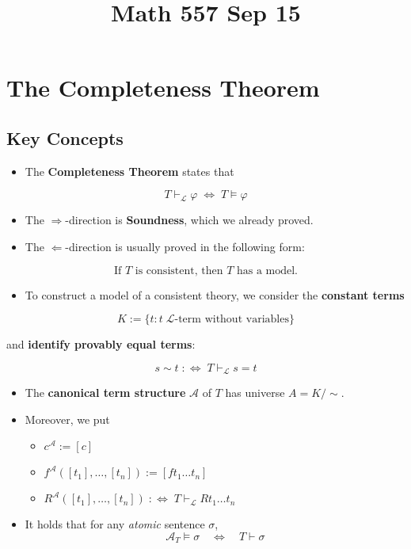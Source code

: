 \documentclass[
]{article}
\title{Math 557 Sep 15}
\author{}
\date{}
\providecommand{\tightlist}{%
  \setlength{\itemsep}{0pt}\setlength{\parskip}{0pt}}
\theoremstyle{definition}
\theoremstyle{remark}
\begin{document}
\maketitle


\section{The Completeness Theorem}\label{the-completeness-theorem}

\subsection{Key Concepts}\label{key-concepts}

\begin{itemize}
\tightlist
\item
  The \textbf{Completeness Theorem} states that
\end{itemize}

\[T \vdash_{\mathcal{L}} \varphi  \; \iff \; T \models \varphi\]

\begin{itemize}
\item
  The \(\Rightarrow\)-direction is \textbf{Soundness}, which we already
  proved.
\item
  The \(\Leftarrow\)-direction is usually proved in the following form:
\end{itemize}

\[\text{If $T$ is consistent, then $T$ has a model.}\]

\begin{itemize}
\tightlist
\item
  To construct a model of a consistent theory, we consider the
  \textbf{constant terms}
\end{itemize}

\[K := \{ t \colon t \; \mathcal{L}\text{-term without variables}\}\]

and \textbf{identify provably equal terms}:

\[s \sim t \; :\iff \; T \vdash_{\mathcal{L}} s = t\]

\begin{itemize}
\item
  The \textbf{canonical term structure} \(\mathcal{A}\) of \(T\) has
  universe \(A = K/\sim\).
\item
  Moreover, we put

  \begin{itemize}
  \tightlist
  \item
    \(c^\mathcal{A} := [c]\)
  \item
    \(f^\mathcal{A}([t_1], \dots, [t_n]) := [ft_1\dots t_n]\)
  \item
    \(R^\mathcal{A}([t_1], \dots, [t_n]) \; : \iff \; T \vdash_\mathcal{L} Rt_1\dots t_n\)
  \end{itemize}
\item
  It holds that for any \emph{atomic} sentence \(\sigma\),
  \[\mathcal{A}_T \models \sigma \quad \iff \quad T \vdash \sigma\]
\end{itemize}
\end{document}
